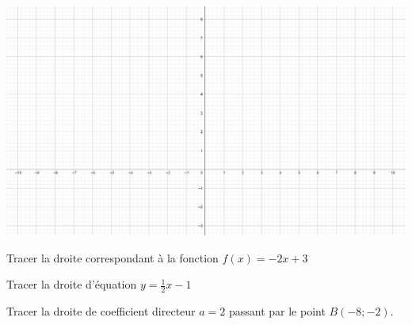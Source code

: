 \section{}


\begin{center}
	\includegraphics[scale=0.5]{vide}
\end{center}
\begin{questions}
	
	
	
	\question[2] Tracer la droite correspondant à la fonction $f(x) = -2x + 3$
	
	
	\fillwithdottedlines{3cm}
	
	\question[2]Tracer la droite d'équation $ y  = \frac{1}{2}x - 1$
%	
	\fillwithdottedlines{3cm}
	
	\question[2] Tracer la droite de coefficient directeur $a = 2$ passant par le point $B(-8; -2)$.
	

\end{questions}

\section{}


